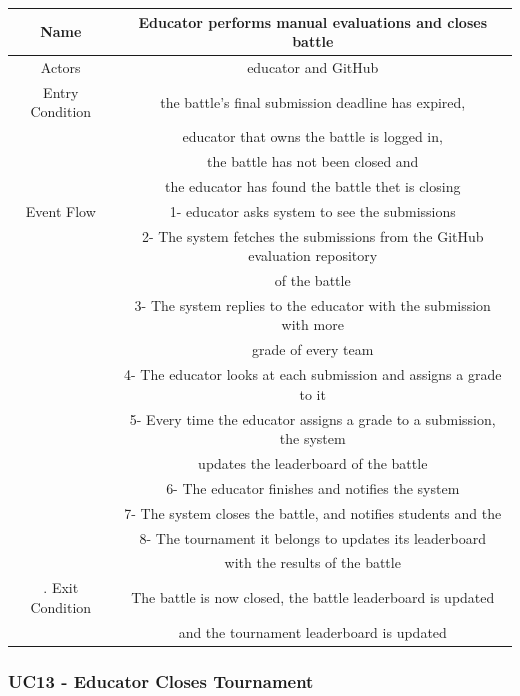 \documentclass{article}
\begin{document}
\begin{tabular*}{\linewidth}{@{\extracolsep{\fill}} cc }
    \hline
    Name & Educator performs manual evaluations and closes battle\\ 
    \hline
    Actors & educator and GitHub\\ 
    \hline
    Entry Condition & the battle's final submission deadline has expired,\\
                    & educator that owns the battle is logged in, \\
                    & the battle has not been closed and\\
                    & the educator has found the battle thet is closing\\
    \hline
    Event Flow & 1- educator asks system to see the submissions\\
               & 2- The system fetches the submissions from the GitHub evaluation repository\\
               & of the battle\\
               & 3- The system replies to the educator with the submission with more \\
               & grade of every team\\
               & 4- The educator looks at each submission and assigns a grade to it\\
               & 5- Every time the educator assigns a grade to a submission, the system\\
               & updates the leaderboard of the battle\\
               & 6- The educator finishes and notifies the system\\
               & 7- The system closes the battle, and notifies students and the \\
               & 8- The tournament it belongs to updates its leaderboard \\
               & with the results of the battle \\
    \hline.
    Exit Condition & The battle is now closed, the battle leaderboard is updated\\
                   & and the tournament leaderboard is updated\\
    \hline
\end{tabular*}

\subsubsection*{UC13 - Educator Closes Tournament}
\end{document}
